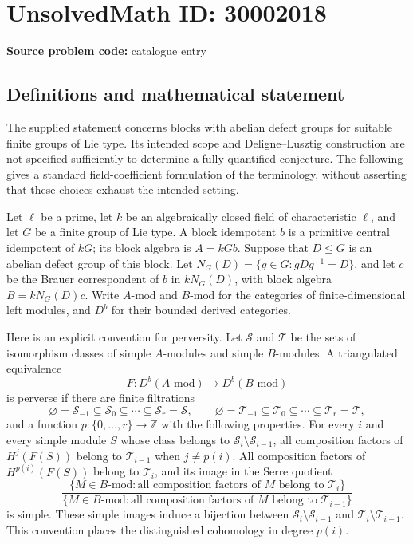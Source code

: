 \documentclass[11pt]{article}
\newcommand{\Z}{\mathbb{Z}}
\begin{document}
\section*{UnsolvedMath ID: 30002018}
\textbf{Source problem code:} catalogue entry
\subsection{Definitions and mathematical statement}
The supplied statement concerns blocks with abelian defect groups for suitable finite groups of Lie type. Its intended scope and Deligne--Lusztig construction are not specified sufficiently to determine a fully quantified conjecture. The following gives a standard field-coefficient formulation of the terminology, without asserting that these choices exhaust the intended setting.

Let \(\ell\) be a prime, let \(k\) be an algebraically closed field of characteristic \(\ell\), and let \(G\) be a finite group of Lie type. A block idempotent \(b\) is a primitive central idempotent of \(kG\); its block algebra is \(A=kGb\). Suppose that \(D\leq G\) is an abelian defect group of this block. Let \(N_G(D)=\{g\in G:gDg^{-1}=D\}\), and let \(c\) be the Brauer correspondent of \(b\) in \(kN_G(D)\), with block algebra \(B=kN_G(D)c\). Write \(A\text{-}\mathrm{mod}\) and \(B\text{-}\mathrm{mod}\) for the categories of finite-dimensional left modules, and \(D^b\) for their bounded derived categories.

Here is an explicit convention for perversity. Let \(\mathcal S\) and \(\mathcal T\) be the sets of isomorphism classes of simple \(A\)-modules and simple \(B\)-modules. A triangulated equivalence
\[
F:D^b(A\text{-}\mathrm{mod})\longrightarrow D^b(B\text{-}\mathrm{mod})
\]
is perverse if there are finite filtrations
\[
\varnothing=\mathcal S_{-1}\subseteq\mathcal S_0\subseteq\cdots\subseteq\mathcal S_r=\mathcal S,
\qquad
\varnothing=\mathcal T_{-1}\subseteq\mathcal T_0\subseteq\cdots\subseteq\mathcal T_r=\mathcal T,
\]
and a function \(p:\{0,\ldots,r\}\to\Z\) with the following properties. For every \(i\) and every simple module \(S\) whose class belongs to \(\mathcal S_i\setminus\mathcal S_{i-1}\), all composition factors of \(H^j(F(S))\) belong to \(\mathcal T_{i-1}\) when \(j\ne p(i)\). All composition factors of \(H^{p(i)}(F(S))\) belong to \(\mathcal T_i\), and its image in the Serre quotient
\[
\frac{\{M\in B\text{-}\mathrm{mod}:\text{all composition factors of }M\text{ belong to }\mathcal T_i\}}
{\{M\in B\text{-}\mathrm{mod}:\text{all composition factors of }M\text{ belong to }\mathcal T_{i-1}\}}
\]
is simple. These simple images induce a bijection between \(\mathcal S_i\setminus\mathcal S_{i-1}\) and \(\mathcal T_i\setminus\mathcal T_{i-1}\). This convention places the distinguished cohomology in degree \(p(i)\).
\end{document}
